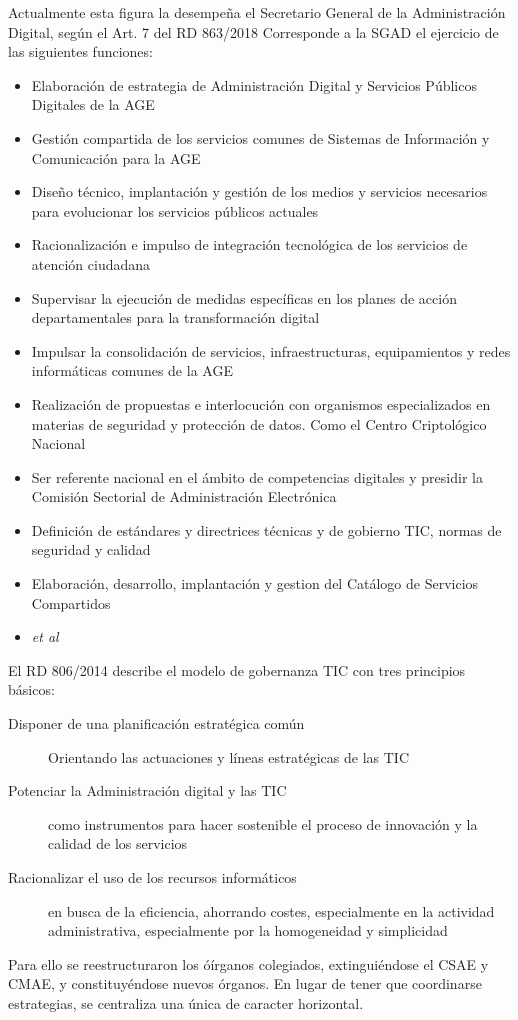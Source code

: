         Actualmente esta figura la desempeña el Secretario General de la Administración Digital, según el Art. 7 del RD 863/2018 Corresponde a la SGAD el ejercicio de las siguientes funciones:
        \begin{itemize}
            \item Elaboración de estrategia de Administración Digital y Servicios Públicos Digitales de la AGE
            \item Gestión compartida de los servicios comunes de Sistemas de Información y Comunicación para la AGE
            \item Diseño técnico, implantación y gestión de los medios y servicios necesarios para evolucionar los servicios públicos actuales
            \item Racionalización e impulso de integración tecnológica de los servicios de atención ciudadana
            \item Supervisar la ejecución de medidas específicas en los planes de acción departamentales para la transformación digital
            \item Impulsar la consolidación de servicios, infraestructuras, equipamientos y redes informáticas comunes de la AGE
            \item Realización de propuestas e interlocución con organismos especializados en materias de seguridad y protección de datos. Como el Centro Criptológico Nacional
            \item Ser referente nacional en el ámbito de competencias digitales y presidir la Comisión Sectorial de Administración Electrónica
            \item Definición de estándares y directrices técnicas y de gobierno TIC, normas de seguridad y calidad
            \item Elaboración, desarrollo, implantación y gestion del Catálogo de Servicios Compartidos
            \item \textit{et al}
        \end{itemize}
        
        El RD 806/2014 describe el modelo de gobernanza TIC con tres principios básicos:
        \begin{description}
            \item[Disponer de una planificación estratégica común] Orientando las actuaciones y líneas estratégicas de las TIC
            \item[Potenciar la Administración digital y las TIC] como instrumentos para hacer sostenible el proceso de innovación y la calidad de los servicios
            \item[Racionalizar el uso de los recursos informáticos] en busca de la eficiencia, ahorrando costes, especialmente en la actividad administrativa, especialmente por la homogeneidad y simplicidad
        \end{description}
        Para ello se reestructuraron los óírganos colegiados, extinguiéndose el CSAE y CMAE, y constituyéndose nuevos órganos. En lugar de tener que coordinarse estrategias, se centraliza una única de caracter horizontal.

